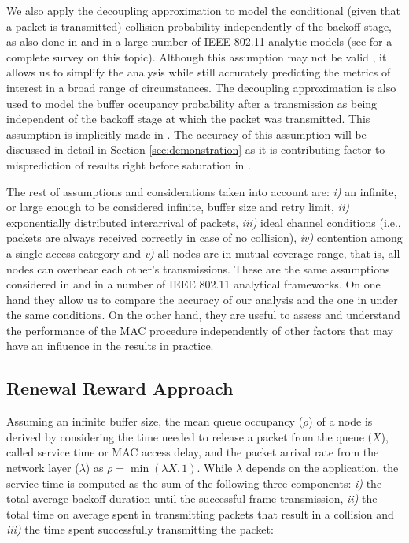 \documentclass[preprint,12pt]{elsarticle}
\begin{document}
We also apply the decoupling approximation to model the conditional (given that a packet is transmitted) collision probability independently of the backoff stage, as also done in \cite{chung2006performance} and in a large number of IEEE 802.11 analytic models (see \cite{Duffy2010} for a complete survey on this topic). Although this assumption may not be valid \cite{Huang2010}, it allows us to simplify the analysis while still accurately predicting the metrics of interest in a broad range of circumstances. The decoupling approximation is also used to model the buffer occupancy probability after a transmission as being independent of the backoff stage at which the packet was transmitted. This assumption is implicitly made in \cite{chung2006performance}. The accuracy of this assumption will be discussed in detail in Section \ref{sec:demonstration} as it is contributing factor to misprediction of results right before saturation in \cite{chung2006performance}.

The rest of assumptions and considerations taken into account are: \emph{i)} an infinite, or large enough to be considered infinite, buffer size and retry limit, \emph{ii)} exponentially distributed interarrival of packets, \emph{iii)} ideal channel conditions (i.e., packets are always received correctly in case of no collision), \emph{iv)} contention among a single access category and \emph{v)} all nodes are in mutual coverage range, that is, all nodes can overhear each other's transmissions. These are the same assumptions considered in \cite{chung2006performance} and in a number of IEEE 802.11 analytical frameworks. On one hand they allow us to compare the accuracy of our analysis and the one in \cite{chung2006performance} under the same conditions. On the other hand, they are useful to assess and understand the performance of the MAC procedure independently of other factors that may have an influence in the results in practice.

\subsection{Renewal Reward Approach}

Assuming an infinite buffer size, the mean queue occupancy ($\rho$) of a node is derived by considering the time needed to release a packet from the queue ($X$), called service time or MAC access delay, and the packet arrival rate from the network layer ($\lambda$) as $\rho=\min(\lambda X,1)$. While $\lambda$ depends on the application, the service time is computed as the sum of the following three components: \emph{i)} the total average backoff duration until the successful frame transmission, \emph{ii)} the total time on average spent in transmitting packets that result in a collision and \emph{iii)} the time spent successfully transmitting the packet:
\end{document}
